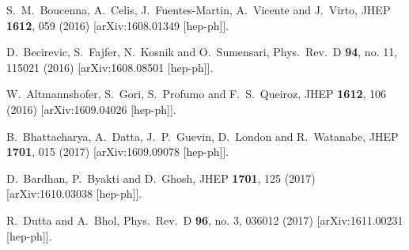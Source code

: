 \documentclass[prd,preprint,superscriptaddress,amsmath,amssymb]{revtex4}
\begin{document}
\begin{thebibliography}{100}
  
  S.~M.~Boucenna, A.~Celis, J.~Fuentes-Martin, A.~Vicente and J.~Virto,
  JHEP {\bf 1612}, 059 (2016)
  [arXiv:1608.01349 [hep-ph]].
  
  D.~Becirevic, S.~Fajfer, N.~Kosnik and O.~Sumensari,
  Phys.\ Rev.\ D {\bf 94}, no. 11, 115021 (2016)
  [arXiv:1608.08501 [hep-ph]].
  
  W.~Altmannshofer, S.~Gori, S.~Profumo and F.~S.~Queiroz,
  JHEP {\bf 1612}, 106 (2016)
  [arXiv:1609.04026 [hep-ph]].
  
  B.~Bhattacharya, A.~Datta, J.~P.~Guevin, D.~London and R.~Watanabe,
  JHEP {\bf 1701}, 015 (2017)
  [arXiv:1609.09078 [hep-ph]].
  
  
  D.~Bardhan, P.~Byakti and D.~Ghosh,
  JHEP {\bf 1701}, 125 (2017)
  [arXiv:1610.03038 [hep-ph]].

  R.~Dutta and A.~Bhol,
  Phys.\ Rev.\ D {\bf 96}, no. 3, 036012 (2017)
  [arXiv:1611.00231 [hep-ph]].
 

\end{thebibliography}
\end{document}
